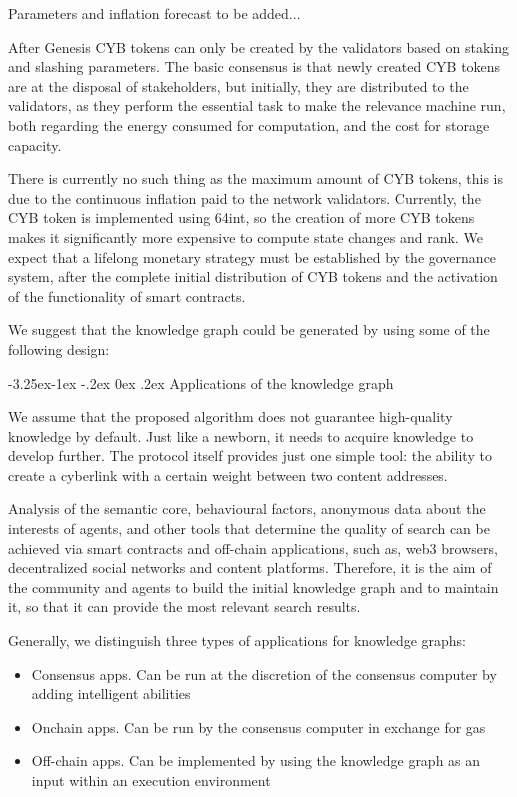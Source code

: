 \documentclass[8pt,oneside]{amsart}
\makeatletter
\renewcommand\subsection{\@startsection{subsection}{2}{\z@}%
                                     {-3.25ex\@plus -1ex \@minus -.2ex}%
                                     {0ex \@plus .2ex}%
                                     {\play\Large}}%
\newcommand{\titleSection}[1]{\subsection{#1}}
\newenvironment{Figure}
  {\par\medskip\noindent\minipage{\linewidth}}
  {\endminipage\par\medskip}
\makeatother
\begin{document}
\begin{Abstract}
\begin{itemize}
\end{itemize}

\begin{Figure}
 \centering
 
\end{Figure}

Parameters and inflation forecast to be added...

After Genesis CYB tokens can only be created by the validators based on staking and slashing parameters. The basic consensus is that newly created CYB tokens are at the disposal of stakeholders, but initially, they are distributed to the validators, as they perform the essential task to make the relevance machine run, both regarding the energy consumed for computation, and the cost for storage capacity.

There is currently no such thing as the maximum amount of CYB tokens, this is due to the continuous inflation paid to the network validators. Currently, the CYB token is implemented using 64int, so the creation of more CYB tokens makes it significantly more expensive to compute state changes and rank. We expect that a lifelong monetary strategy must be established by the governance system, after the complete initial distribution of CYB tokens and the activation of the functionality of smart contracts.

We suggest that the knowledge graph could be generated by using some of the following design:

\titleSection{Applications of the knowledge graph}\label{Applications of the knowledge graph}

We assume that the proposed algorithm does not guarantee high-quality knowledge by default. Just like a newborn, it needs to acquire knowledge to develop further. The protocol itself provides just one simple tool: the ability to create a cyberlink with a certain weight between two content addresses.

Analysis of the semantic core, behavioural factors, anonymous data about the interests of agents, and other tools that determine the quality of search can be achieved via smart contracts and off-chain applications, such as, web3 browsers, decentralized social networks and content platforms. Therefore, it is the aim of the community and agents to build the initial knowledge graph and to maintain it, so that it can provide the most relevant search results.

Generally, we distinguish three types of applications for knowledge graphs:
\begin{itemize}
\item Consensus apps. Can be run at the discretion of the consensus computer by adding intelligent abilities
\item Onchain apps. Can be run by the consensus computer in exchange for gas
\item Off-chain apps. Can be implemented by using the knowledge graph as an input within an execution environment
\end{itemize}


\end{Abstract}
\end{document}
